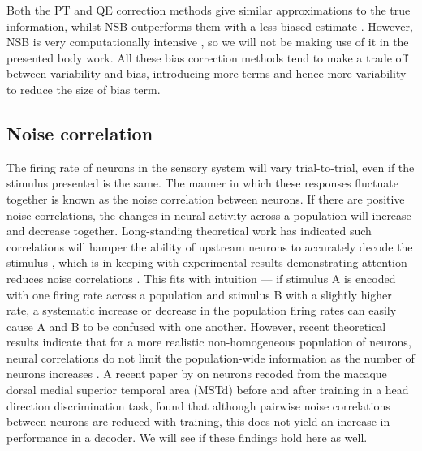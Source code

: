 Both the PT and QE correction methods give similar approximations to the true information, whilst NSB outperforms them with a less biased estimate \cite{Panzeri2007}. However, NSB is very computationally intensive \cite{Panzeri2007}, so we will not be making use of it in the presented body work.
All these bias correction methods tend to make a trade off between variability and bias, introducing more terms and hence more variability to reduce the size of bias term.



\subsection{Noise correlation}

The firing rate of neurons in the sensory system will vary trial-to-trial, even if the stimulus presented is the same. The manner in which these responses fluctuate together is known as the noise correlation between neurons. If there are positive noise correlations, the changes in neural activity across a population will increase and decrease together. Long-standing theoretical work has indicated such correlations will hamper the ability of upstream neurons to accurately decode the stimulus%
, which is in keeping with experimental results demonstrating attention reduces noise correlations \citep{Cohen2009}. This fits with intuition --- if stimulus A is encoded with one firing rate across a population and stimulus B with a slightly higher rate, a systematic increase or decrease in the population firing rates can easily cause A and B to be confused with one another. However, recent theoretical results indicate that for a more realistic non-homogeneous population of neurons, neural correlations do not limit the population-wide information as the number of neurons increases \citep{Oram1998,Averbeck2006,Ecker2011}.
A recent paper by \citet{Gu2011} on neurons recoded from the macaque dorsal medial superior temporal area (MSTd) before and after training in a head direction discrimination task, found that although pairwise noise correlations between neurons are reduced with training, this does not yield an increase in performance in a decoder. We will see if these findings hold here as well.




